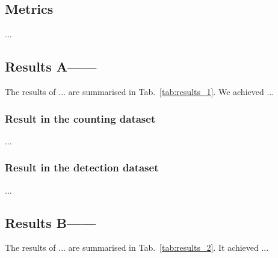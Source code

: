 \subsection{Metrics}
...

\subsection{Results A——}
The results of ... are summarised in Tab.~\ref{tab:results_1}. We achieved ...

\begin{table}[htb]
\centering
\caption{Results of ...}
\label{tab:results_1}
\end{table}

\subsubsection{Result in the counting dataset}
... 


\subsubsection{Result in the detection dataset}
...


\subsection{Results B——}
The results of ... are summarised in Tab.~\ref{tab:results_2}. It achieved ...

\begin{table}[htb]
\centering
\caption{Results of ...}
\label{tab:results_2}
\end{table}

